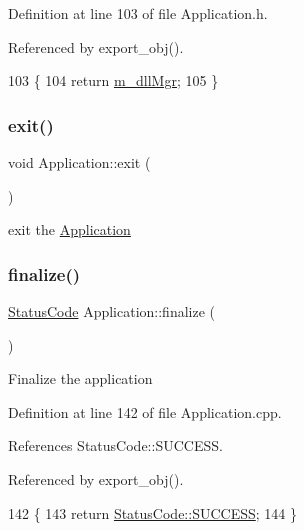 Definition at line 103 of file Application.\+h.



Referenced by export\+\_\+obj().


\begin{DoxyCode}
103                     \{
104     \textcolor{keywordflow}{return} \hyperlink{classApplication_a66b06cbeb824fe00ecd11499fcf01c55}{m\_dllMgr};
105   \}
\end{DoxyCode}
\mbox{\label{classApplication_a3c8a98d6c10a5b054800488df16cdbcb}} 
\subsubsection{\texorpdfstring{exit()}{exit()}}
{\footnotesize\ttfamily void Application\+::exit (\begin{DoxyParamCaption}{ }\end{DoxyParamCaption})}

exit the \hyperlink{classApplication}{Application} \mbox{\label{classApplication_a5e2b592eebe6f2f8780d2c129bf14560}} 
\subsubsection{\texorpdfstring{finalize()}{finalize()}}
{\footnotesize\ttfamily \hyperlink{classStatusCode}{Status\+Code} Application\+::finalize (\begin{DoxyParamCaption}{ }\end{DoxyParamCaption})}

Finalize the application 

Definition at line 142 of file Application.\+cpp.



References Status\+Code\+::\+S\+U\+C\+C\+E\+SS.



Referenced by export\+\_\+obj().


\begin{DoxyCode}
142                                    \{
143   \textcolor{keywordflow}{return} \hyperlink{classStatusCode_a6f565cbeadc76d14c72f047e5e85eb4badd0da38d3ba0d922efd1f4619bc37ad8}{StatusCode::SUCCESS};
144 \}
\end{DoxyCode}
\mbox{\label{classApplication_a095248805e26b553466b7fafc6517d8f}} 
